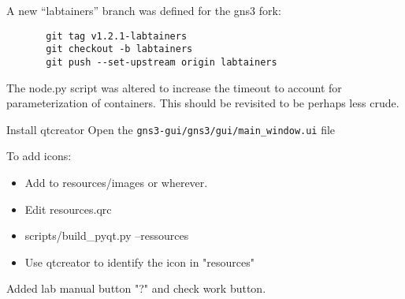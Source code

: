 \documentclass[12pt]{article}
\begin{document}
\normalsize
\noindent A new ``labtainers'' branch was defined for the gns3 fork:
\begin{verbatim}
       git tag v1.2.1-labtainers
       git checkout -b labtainers
       git push --set-upstream origin labtainers
\end{verbatim}

The node.py script was altered to increase the timeout to account for parameterization of
containers.  This should be revisited to be perhaps less crude.

\bigskip
Install qtcreator
Open the {\tt gns3-gui/gns3/gui/main\_window.ui} file

To add icons:
\begin{itemize}
\item Add to resources/images or wherever.
\item Edit resources.qrc
\item scripts/build\_pyqt.py --ressources
\item Use qtcreator to identify the icon in "resources"
\end{itemize}
Added lab manual button "?" and check work button.
\end{document}
